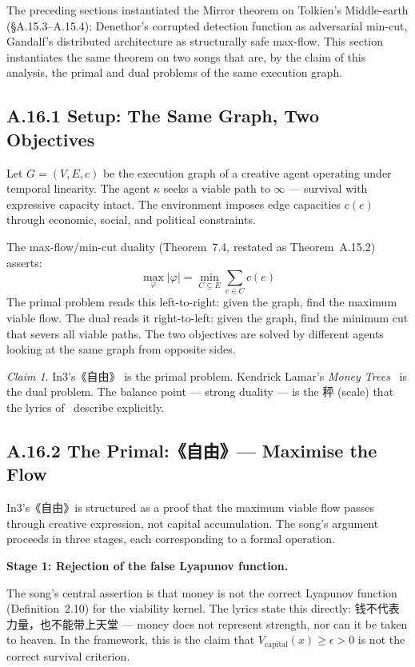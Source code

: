 \documentclass[11pt,a4paper]{article}
\theoremstyle{definition}
\theoremstyle{remark}
\newtheorem{claim}[theorem]{Claim}
\begin{document}
The preceding sections instantiated the Mirror theorem on Tolkien's Middle-earth (\S A.15.3--A.15.4): Denethor's corrupted detection function as adversarial min-cut, Gandalf's distributed architecture as structurally safe max-flow. This section instantiates the same theorem on two songs that are, by the claim of this analysis, the primal and dual problems of the same execution graph.


\subsection{A.16.1 Setup: The Same Graph, Two Objectives}

Let $G = (V, E, c)$ be the execution graph of a creative agent operating under temporal linearity. The agent $\kappa$ seeks a viable path to $\infty$ --- survival with expressive capacity intact. The environment imposes edge capacities $c(e)$ through economic, social, and political constraints.

The max-flow/min-cut duality (Theorem~7.4, restated as Theorem~A.15.2) asserts:
\[
  \max_\varphi |\varphi| = \min_{C \subseteq E} \sum_{e \in C} c(e)
\]
The primal problem reads this left-to-right: given the graph, find the maximum viable flow. The dual reads it right-to-left: given the graph, find the minimum cut that severs all viable paths. The two objectives are solved by different agents looking at the same graph from opposite sides.

\begin{claim}
In3's《自由》\cite{in3} is the primal problem. Kendrick Lamar's \emph{Money Trees}~\cite{lamar2012} is the dual problem. The balance point --- strong duality --- is the 秤 (scale) that the lyrics of~\cite{in3} describe explicitly.
\end{claim}


\subsection{A.16.2 The Primal:《自由》--- Maximise the Flow}

In3's《自由》is structured as a proof that the maximum viable flow passes through creative expression, not capital accumulation. The song's argument proceeds in three stages, each corresponding to a formal operation.

\textbf{Stage 1: Rejection of the false Lyapunov function.}

The song's central assertion is that money is not the correct Lyapunov function (Definition~2.10) for the viability kernel. The lyrics state this directly: 钱不代表力量，也不能带上天堂 --- money does not represent strength, nor can it be taken to heaven. In the framework, this is the claim that $V_{\text{capital}}(x) \geq \epsilon > 0$ is not the correct survival criterion.
\end{document}
